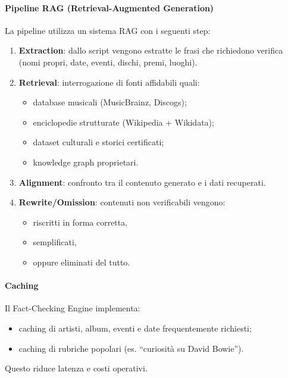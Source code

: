 \documentclass[11pt,a4paper]{article}
\begin{document}
\paragraph{Pipeline RAG (Retrieval-Augmented Generation)}

La pipeline utilizza un sistema RAG con i seguenti step:

\begin{enumerate}
    \item \textbf{Extraction}: dallo script vengono estratte le frasi che richiedono verifica (nomi propri, date, eventi, dischi, premi, luoghi).
    \item \textbf{Retrieval}: interrogazione di fonti affidabili quali:
    \begin{itemize}
        \item database musicali (MusicBrainz, Discogs);
        \item enciclopedie strutturate (Wikipedia + Wikidata);
        \item dataset culturali e storici certificati;
        \item knowledge graph proprietari.
    \end{itemize}
    \item \textbf{Alignment}: confronto tra il contenuto generato e i dati recuperati.
    \item \textbf{Rewrite/Omission}: contenuti non verificabili vengono:
    \begin{itemize}
        \item riscritti in forma corretta,
        \item semplificati,
        \item oppure eliminati del tutto.
    \end{itemize}
\end{enumerate}

\paragraph{Caching}

Il Fact-Checking Engine implementa:
\begin{itemize}
    \item caching di artisti, album, eventi e date frequentemente richiesti;
    \item caching di rubriche popolari (es. “curiosità su David Bowie”).
\end{itemize}

Questo riduce latenza e costi operativi.
\end{document}
